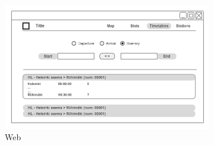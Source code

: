 \begin{figure}[ht]
    \centering
    \begin{subfigure}[b]{0.6\textwidth}
        \includegraphics[width=\textwidth]
          {img/c02-application/png/web-website-timetables.png}
        \caption{Web}
    \end{subfigure}
    ~
    \begin{subfigure}[b]{0.2\textwidth}

\end{subfigure}
\end{figure}
